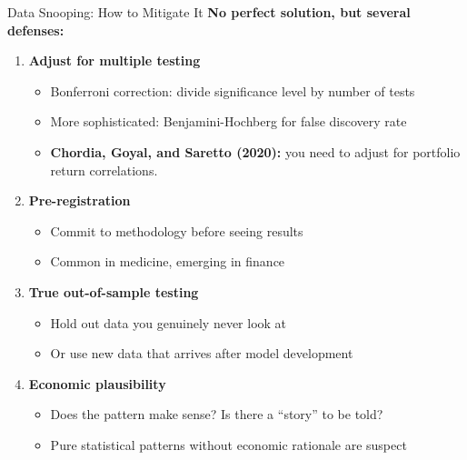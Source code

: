 \documentclass[10pt]{beamer}
\begin{document}
\begin{frame}{Data Snooping: How to Mitigate It}
  \textbf{No perfect solution, but several defenses:}
  
  \vspace{0.5em}
  \begin{enumerate}
    \item \textbf{Adjust for multiple testing}
    \begin{itemize}
      \item Bonferroni correction: divide significance level by number of tests
      \item More sophisticated: Benjamini-Hochberg for false discovery rate
      \item \textbf{Chordia, Goyal, and Saretto (2020):} you need to adjust for portfolio return correlations. 
    \end{itemize}
    \vspace{0.3em}
    \item \textbf{Pre-registration}
    \begin{itemize}
      \item Commit to methodology before seeing results
      \item Common in medicine, emerging in finance
    \end{itemize}
    \vspace{0.3em}
    \item \textbf{True out-of-sample testing}
    \begin{itemize}
      \item Hold out data you genuinely never look at
      \item Or use new data that arrives after model development
    \end{itemize}
    \vspace{0.3em}
    \item \textbf{Economic plausibility}
    \begin{itemize}
      \item Does the pattern make sense? Is there a ``story'' to be told?
      \item Pure statistical patterns without economic rationale are suspect
    \end{itemize}
  \end{enumerate}
\end{frame}
\end{document}

